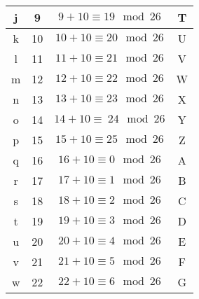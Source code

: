 \documentclass[10pt,a4paper]{article}
\begin{document}
\begin{table}[htdp]
\begin{center}
\begin{tabular}{|c|c|c|c|}
	j & 9 & \begin{math} 9 + 10 \equiv 19 \mod 26 \end{math}   & T \\ \hline
	k & 10 & \begin{math} 10 + 10 \equiv 20 \mod 26 \end{math}  & U \\ \hline
	l & 11 & \begin{math} 11+ 10 \equiv 21 \mod 26 \end{math}  & V \\ \hline
	m & 12 & \begin{math} 12 + 10 \equiv 22 \mod 26 \end{math} & W \\ \hline
	n & 13 & \begin{math} 13 + 10 \equiv 23 \mod 26 \end{math} & X \\ \hline
	o & 14 & \begin{math} 14 + 10 \equiv\ 24 \mod 26 \end{math} & Y \\ \hline
	p & 15 & \begin{math} 15 + 10 \equiv 25 \mod 26 \end{math} & Z \\ \hline
	q & 16 & \begin{math} 16 + 10 \equiv 0 \mod 26 \end{math} & A \\ \hline
	r & 17 & \begin{math} 17 + 10 \equiv 1 \mod 26 \end{math}  & B \\ \hline
	s & 18 & \begin{math} 18 + 10 \equiv 2 \mod 26 \end{math} & C \\ \hline
	t & 19 & \begin{math} 19 + 10 \equiv 3 \mod 26 \end{math} & D \\ \hline
	u & 20 & \begin{math} 20 + 10 \equiv 4 \mod 26 \end{math} & E \\ \hline
	v & 21 & \begin{math} 21 + 10 \equiv 5 \mod 26 \end{math} & F \\ \hline
	w & 22 & \begin{math} 22 + 10 \equiv 6 \mod 26 \end{math} & G \\ \hline

\end{tabular}
\end{center}
\end{table}
\end{document}
